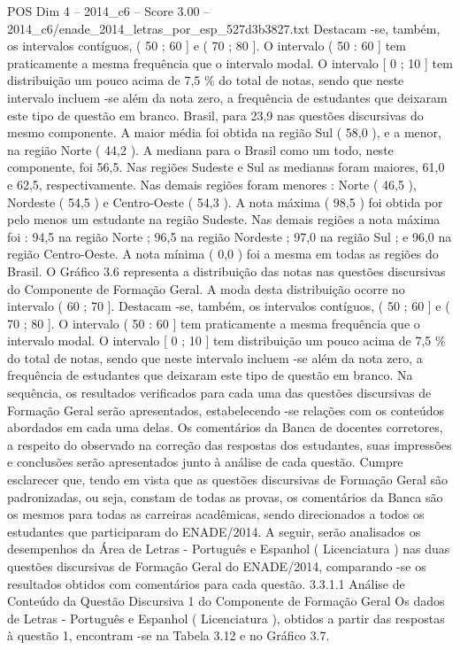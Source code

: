 \begin{textsample}{POS Dim 4 – 2014\_c6 – Score 3.00 – 2014\_c6/enade\_2014\_letras\_por\_esp\_527d3b3827.txt}
Destacam -se, também, os intervalos contíguos, ( 50 ; 60 ] e ( 70 ; 80 ].
O intervalo ( 50 : 60 ] tem praticamente a mesma frequência que o intervalo modal.
O intervalo [ 0 ; 10 ] tem distribuição um pouco acima de 7,5 \% do total de notas, sendo que neste intervalo incluem -se além da nota zero, a frequência de estudantes que deixaram este tipo de questão em branco.
Brasil, para 23,9 nas questões discursivas do mesmo componente.
A maior média foi obtida na região Sul ( 58,0 ), e a menor, na região Norte ( 44,2 ).
A mediana para o Brasil como um todo, neste componente, foi 56,5.
Nas regiões Sudeste e Sul as medianas foram maiores, 61,0 e 62,5, respectivamente.
Nas demais regiões foram menores : Norte ( 46,5 ), Nordeste ( 54,5 ) e Centro-Oeste ( 54,3 ).
A nota máxima ( 98,5 ) foi obtida por pelo menos um estudante na região Sudeste.
Nas demais regiões a nota máxima foi : 94,5 na região Norte ; 96,5 na região Nordeste ; 97,0 na região Sul ; e 96,0 na região Centro-Oeste.
A nota mínima ( 0,0 ) foi a mesma em todas as regiões do Brasil.
O Gráfico 3.6 representa a distribuição das notas nas questões discursivas do Componente de Formação Geral.
A moda desta distribuição ocorre no intervalo ( 60 ; 70 ].
Destacam -se, também, os intervalos contíguos, ( 50 ; 60 ] e ( 70 ; 80 ].
O intervalo ( 50 : 60 ] tem praticamente a mesma frequência que o intervalo modal.
O intervalo [ 0 ; 10 ] tem distribuição um pouco acima de 7,5 \% do total de notas, sendo que neste intervalo incluem -se além da nota zero, a frequência de estudantes que deixaram este tipo de questão em branco.
Na sequência, os resultados verificados para cada uma das questões discursivas de Formação Geral serão apresentados, estabelecendo -se relações com os conteúdos abordados em cada uma delas.
Os comentários da Banca de docentes corretores, a respeito do observado na correção das respostas dos estudantes, suas impressões e conclusões serão apresentados junto à análise de cada questão.
Cumpre esclarecer que, tendo em vista que as questões discursivas de Formação Geral são padronizadas, ou seja, constam de todas as provas, os comentários da Banca são os mesmos para todas as carreiras acadêmicas, sendo direcionados a todos os estudantes que participaram do ENADE/2014.
A seguir, serão analisados os desempenhos da Área de Letras - Português e Espanhol ( Licenciatura ) nas duas questões discursivas de Formação Geral do ENADE/2014, comparando -se os resultados obtidos com comentários para cada questão. 3.3.1.1 Análise de Conteúdo da Questão Discursiva 1 do Componente de Formação Geral Os dados de Letras - Português e Espanhol ( Licenciatura ), obtidos a partir das respostas à questão 1, encontram -se na Tabela 3.12 e no Gráfico 3.7.

\end{textsample}
